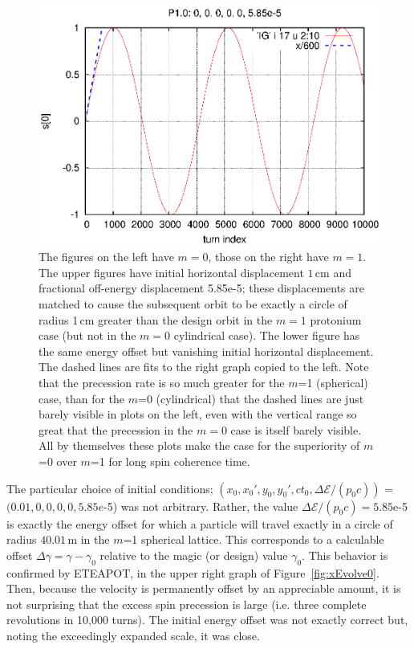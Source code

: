 \documentclass[]{article}
\begin{document}
\begin{figure}[h]
\includegraphics[scale=0.6]{eps/SpinEvolve17.P1.0.eps}
\caption{\label{fig:SpinEvolve0.17}The figures on the left have 
$m=0$, those on the right have $m=1$. The upper figures
have initial horizontal displacement $1\,$cm and fractional
off-energy displacement 5.85e-5; these displacements are 
matched to cause the subsequent orbit to be exactly a circle 
of radius 1\,cm greater than the design orbit in the $m=1$
protonium case (but not in the $m=0$ cylindrical case). 
The lower figure
has the same energy offset but vanishing initial horizontal
displacement. The dashed lines are fits to
the right graph copied to the left. Note that the precession
rate is so much greater for the $m$=1 (spherical) case,
than for the $m$=0 (cylindrical) that the dashed lines
are just barely visible in plots on the left, even with
the vertical range so great that the precession in the
$m=0$ case is itself barely visible. All by themselves these
plots make the case for the superiority of $m$=0 over $m$=1 for
long spin coherence time.
}
\end{figure}
%

\clearpage

The particular choice of initial conditions;
$(x_0, x_0', y_0, y_0', ct_0, \Delta\mathcal{E}/(p_0c))$ = 
$(0.01, 0, 0, 0, 0, 5.85e$-5)
was not arbitrary. Rather, the value $\Delta\mathcal{E}/(p_0c)=5.85$e-5
is exactly the energy offset for which a particle will travel exactly 
in a circle of radius $40.01\,$m in the $m$=1 spherical lattice. 
This corresponds to a calculable offset $\Delta\gamma=\gamma-\gamma_0$ 
relative to the magic (or design) value $\gamma_0$. 
This behavior is confirmed by ETEAPOT, in the upper right graph of
Figure~\ref{fig:xEvolve0}. Then, because the velocity 
is permanently offset by an appreciable amount, it is not surprising 
that the excess spin precession is large 
(i.e. three complete revolutions in 10,000 turns).
The initial energy offset was not exactly correct but, noting the
exceedingly expanded scale, it was close.
\end{document}
